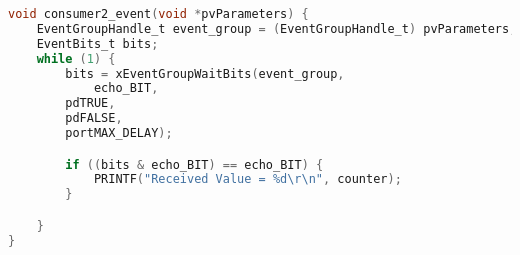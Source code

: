 \begin{lstlisting}[language=c,caption=Problem 4.3 Consumer 2 Task, label=list:p4_3_cons2]
void consumer2_event(void *pvParameters) {
    EventGroupHandle_t event_group = (EventGroupHandle_t) pvParameters;
    EventBits_t bits;
    while (1) {
        bits = xEventGroupWaitBits(event_group,
            echo_BIT,
        pdTRUE,
        pdFALSE,
        portMAX_DELAY);

        if ((bits & echo_BIT) == echo_BIT) {
            PRINTF("Received Value = %d\r\n", counter);
        }

    }
}
\end{lstlisting}
